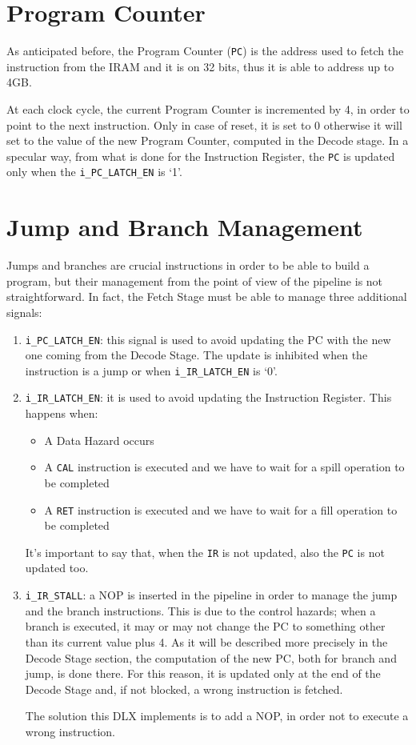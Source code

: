 \section{Program Counter}
As anticipated before, the Program Counter (\texttt{PC}) is the address used to fetch the instruction from the IRAM and it is on 32 bits, thus it is able to address up to 4GB.

At each clock cycle, the current Program Counter is incremented by 4, in order to point to the next instruction. Only in case of reset, it is set to 0 otherwise it will set to the value of the new Program Counter, computed in the Decode stage. In a specular way, from what is done for the Instruction Register, the \texttt{PC} is updated only when the \texttt{i\_PC\_LATCH\_EN} is `1'.

\section{Jump and Branch Management}
\label{sec:jmp_branch}
Jumps and branches are crucial instructions in order to be able to build a program, but their management from the point of view of the pipeline is not straightforward. In fact, the Fetch Stage must be able to manage three additional signals:
\begin{enumerate}
	\item \texttt{i\_PC\_LATCH\_EN}: this signal is used to avoid updating the PC with the new one coming from the Decode Stage. The update is inhibited when the instruction is a jump or when \texttt{i\_IR\_LATCH\_EN} is `0'. 
	\item \texttt{i\_IR\_LATCH\_EN}: it is used to avoid updating the Instruction Register. This happens when:
	\begin{itemize}
		\item A Data Hazard occurs
		\item A \texttt{CAL} instruction is executed and we have to wait for a spill operation to be completed
		\item A \texttt{RET} instruction is executed and we have to wait for a fill operation to be completed
	\end{itemize}
	It's important to say that, when the \texttt{IR} is not updated, also the \texttt{PC} is not updated too.
	\item \texttt{i\_IR\_STALL}: a NOP is inserted in the pipeline in order to manage the jump and the branch instructions. This is due to the control hazards; when a branch is executed, it may or may not change the PC to something other than its current value plus 4. As it will be described more precisely in the Decode Stage section, the computation of the new PC, both for branch and jump, is done there. For this reason, it is updated only at the end of the Decode Stage and, if not blocked, a wrong instruction is fetched.
	
	The solution this DLX implements is to add a NOP, in order not to execute a wrong instruction.
\end{enumerate}